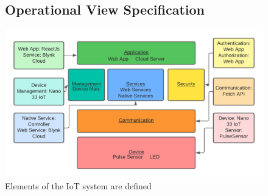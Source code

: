 \documentclass{report}
\begin{document}
\begin{figure}
\subsection{Operational View Specification}
    \centering
    \includegraphics[scale=0.6]{images/Step8.png}
    \caption{Elements of the IoT system are defined}
    \label{fig:image7}
\end{figure}
\end{document}
